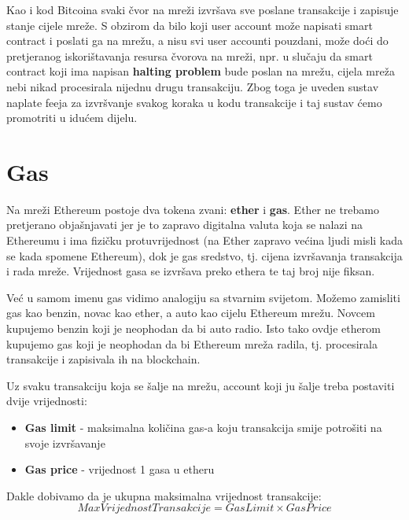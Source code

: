 \documentclass[12pt]{report}
\begin{document}
Kao i kod Bitcoina svaki čvor na mreži izvršava sve poslane transakcije i zapisuje stanje cijele mreže. S obzirom da bilo koji user account može napisati smart contract i poslati ga na mrežu, a nisu svi user accounti pouzdani, može doći do pretjeranog iskorištavanja resursa čvorova na mreži, npr. u slučaju da smart contract koji ima napisan \textbf{halting problem} bude poslan na mrežu, cijela mreža nebi nikad procesirala nijednu drugu transakciju. Zbog toga je uveden sustav naplate feeja za izvršvanje svakog koraka u kodu transakcije i taj sustav ćemo promotriti u idućem dijelu.

\section{Gas}

Na mreži Ethereum postoje dva tokena zvani: \textbf{ether} i \textbf{gas}. Ether ne trebamo pretjerano objašnjavati jer je to zapravo digitalna valuta koja se nalazi na Ethereumu i ima fizičku protuvrijednost (na Ether zapravo većina ljudi misli kada se kada spomene Ethereum), dok je gas sredstvo, tj. cijena izvršavanja transakcija i rada mreže. Vrijednost gasa se izvršava preko ethera te taj broj nije fiksan.

\begin{tcolorbox}
Već u samom imenu gas vidimo analogiju sa stvarnim svijetom. Možemo zamisliti gas kao benzin, novac kao ether, a auto kao cijelu Ethereum mrežu. Novcem kupujemo benzin koji je neophodan da bi auto radio. Isto tako ovdje etherom kupujemo gas koji je neophodan da bi Ethereum mreža radila, tj. procesirala transakcije i zapisivala ih na blockchain.
\end{tcolorbox}

Uz svaku transakciju koja se šalje na mrežu, account koji ju šalje treba postaviti dvije vrijednosti:

\begin{itemize}
    \item \textbf{Gas limit} - maksimalna količina gas-a koju transakcija smije potrošiti na svoje izvršavanje
    \item \textbf{Gas price} - vrijednost 1 gasa u etheru
\end{itemize}

Dakle dobivamo da je ukupna maksimalna vrijednost transakcije:
\begin{equation}
    MaxVrijednostTransakcije = GasLimit \times GasPrice
\end{equation}
\end{document}
